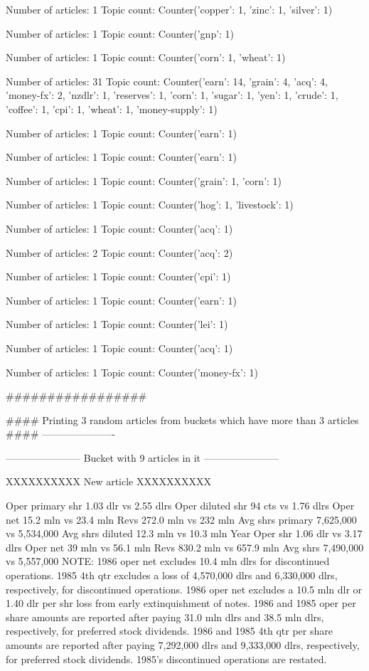 \documentclass{article}
\begin{document}
\begin{pythonOutput}
Number of articles: 1
Topic count: Counter({'copper': 1, 'zinc': 1, 'silver': 1})

Number of articles: 1
Topic count: Counter({'gnp': 1})

Number of articles: 1
Topic count: Counter({'corn': 1, 'wheat': 1})

Number of articles: 31
Topic count: Counter({'earn': 14, 'grain': 4, 'acq': 4, 'money-fx': 2, 'nzdlr': 1, 'reserves': 1, 'corn': 1, 'sugar': 1, 'yen': 1, 'crude': 1, 'coffee': 1, 'cpi': 1, 'wheat': 1, 'money-supply': 1})

Number of articles: 1
Topic count: Counter({'earn': 1})

Number of articles: 1
Topic count: Counter({'earn': 1})

Number of articles: 1
Topic count: Counter({'grain': 1, 'corn': 1})

Number of articles: 1
Topic count: Counter({'hog': 1, 'livestock': 1})

Number of articles: 1
Topic count: Counter({'acq': 1})

Number of articles: 2
Topic count: Counter({'acq': 2})

Number of articles: 1
Topic count: Counter({'cpi': 1})

Number of articles: 1
Topic count: Counter({'earn': 1})

Number of articles: 1
Topic count: Counter({'lei': 1})

Number of articles: 1
Topic count: Counter({'acq': 1})

Number of articles: 1
Topic count: Counter({'money-fx': 1})

#################

#### Printing 3 random articles from buckets which have more than 3 articles ####
----------------------

-----------------------
Bucket with 9 articles in it
-----------------------


XXXXXXXXXX
New article
XXXXXXXXXX

Oper primary shr 1.03 dlr vs 2.55 dlrs
    Oper diluted shr 94 cts vs 1.76 dlrs
    Oper net 15.2 mln vs 23.4 mln
    Revs 272.0 mln vs 232 mln
    Avg shrs primary 7,625,000 vs 5,534,000
    Avg shrs diluted 12.3 mln vs 10.3 mln
    Year
    Oper shr 1.06 dlr vs 3.17 dlrs
    Oper net 39 mln vs 56.1 mln
    Revs 830.2 mln vs 657.9 mln
    Avg shrs 7,490,000 vs 5,557,000
    NOTE: 1986 oper net excludes 10.4 mln dlrs for discontinued
operations.
    1985 4th qtr excludes a loss of 4,570,000 dlrs and
6,330,000 dlrs, respectively, for discontinued operations.
    1986 oper net excludes a 10.5 mln dlr or 1.40 dlr per shr
loss from early extinquishment of notes.
    1986 and 1985 oper per share amounts are reported after
paying 31.0 mln dlrs and 38.5 mln dlrs, respectively, for
preferred stock dividends.
    1986 and 1985 4th qtr per share amounts are reported after
paying 7,292,000 dlrs and 9,333,000 dlrs, respectively, for
preferred stock dividends.
    1985's discontinued operations are restated.


\end{pythonOutput}
\end{document}
